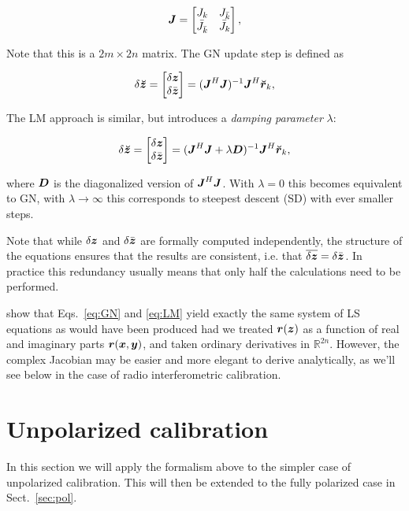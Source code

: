 \documentclass[useAMS,usenatbib]{mn2e}
\makeatletter
\newcommand{\REAL}{\mathbb{R}}
\newcommand{\zz}{\bmath{z}}
\newcommand{\rr}{\bmath{r}}
\newcommand{\mat}[1]{{\bmath{#1}}}
\newcommand{\JJ}{\mat{J}} %
\newcommand{\DD}{\mat{D}}
\newcommand{\Matrix}[2]{\left [ \begin{array}{@{}#1@{}}#2\end{array} \right ]}
\newcommand{\AUG}[1]{\bmath{\breve{#1}}}
\newcommand{\Zz}{\AUG{z}}
\newcommand{\Rr}{\AUG{r}}
\makeatother
\begin{document}
\begin{equation}
\label{eq:JJ}
\JJ = \Matrix{cc}{J_k & J_{\bar{k}} \\ \bar{J}_{\bar{k}} & \bar{J}_k },
\end{equation}

Note that this is a $2m \times 2n$ matrix. The GN update step is defined as

\begin{equation}
\label{eq:GN}
\delta\Zz = \Matrix{c}{\delta \zz \\ \delta \bar{\zz}} = (\JJ^H \JJ)^{-1}\JJ^H \Rr_k,
\end{equation}

The LM approach is similar, but introduces a {\em damping parameter} $\lambda$:

\begin{equation}
\label{eq:LM}
\delta\Zz = \Matrix{c}{\delta \zz \\ \delta \bar{\zz}} = (\JJ^H \JJ + \lambda\DD)^{-1}\JJ^H \Rr_k,
\end{equation}

where $\DD$ is the diagonalized version of $\JJ^H\JJ$. With $\lambda=0$ this becomes equivalent to GN,
with $\lambda\to\infty$ this corresponds to steepest descent (SD) with ever smaller steps.

Note that while $\delta\zz$ and $\delta \bar{\zz}$ are formally computed independently, the structure of the equations 
ensures that the results are consistent, i.e. that $\overline{\delta\zz} = \delta \bar{\zz}$. In practice this 
redundancy usually means that only half the calculations need to be performed.

\citet{ComplexOpt} show that Eqs.~\ref{eq:GN} and \ref{eq:LM} yield exactly the same system of LS equations as would have 
been produced had we treated $\rr(\zz)$ as a function of real and imaginary parts $\rr(\bmath{x},\bmath{y})$, 
and taken ordinary derivatives in $\REAL^{2n}$. However, the complex Jacobian may be easier and more elegant 
to derive analytically, as we'll see below in the case of radio interferometric calibration.

\section{Unpolarized calibration}
\label{sec:unpol}

In this section we will apply the formalism above to the simpler case of unpolarized calibration. 
This will then be extended to the fully polarized case in Sect.~\ref{sec:pol}.
\end{document}
